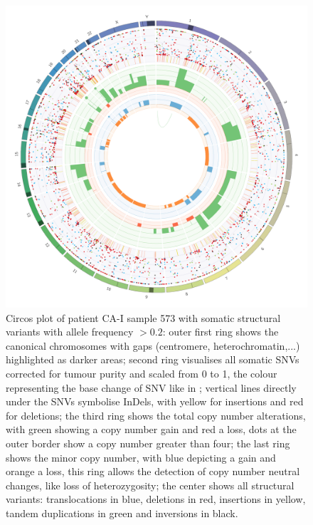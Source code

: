 \begin{figure}[ht]
\centering
\includegraphics[width=.99\linewidth]{Figures/CASCADE/CA51/CA51-573.circos.png}
\caption[Circos plot of patient CA-I sample 573]{Circos plot of patient CA-I sample 573 with somatic structural variants with allele frequency $> 0.2$: outer first ring shows the canonical chromosomes with gaps (centromere, heterochromatin,...) highlighted as darker areas; second ring visualises all somatic SNVs corrected for tumour purity and scaled from 0 to 1, the colour representing the base change of SNV like in \protect\textcite{Alexandrov2013}; vertical lines directly under the SNVs symbolise InDels, with yellow for insertions and red for deletions; the third ring shows the total copy number alterations, with green showing a copy number gain and red a loss, dots at the outer border show a copy number greater than four; the last ring shows the minor copy number, with blue depicting a gain and orange a loss, this ring allows the detection of copy number neutral changes, like loss of heterozygosity; the center shows all structural variants: translocations in blue, deletions in red, insertions in yellow, tandem duplications in green and inversions in black.} \label{fig:ca51.573circos}
\end{figure}

